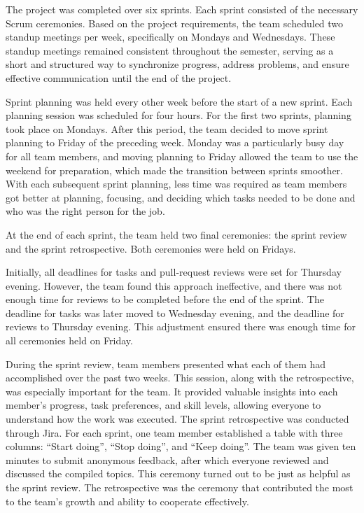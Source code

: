 \medskip

\hspace*{1cm}The project was completed over six sprints. Each sprint consisted of the necessary Scrum ceremonies. Based on the project requirements, the team scheduled two standup meetings per week, specifically on Mondays and Wednesdays. These standup meetings remained consistent throughout the semester, serving as a short and structured way to synchronize progress, address problems, and ensure effective communication until the end of the project.

\medskip
\medskip

\hspace*{1cm}Sprint planning was held every other week before the start of a new sprint. Each planning session was scheduled for four hours. For the first two sprints, planning took place on Mondays. After this period, the team decided to move sprint planning to Friday of the preceding week. Monday was a particularly busy day for all team members, and moving planning to Friday allowed the team to use the weekend for preparation, which made the transition between sprints smoother. With each subsequent sprint planning, less time was required as team members got better at planning, focusing, and deciding which tasks needed to be done and who was the right person for the job.

\medskip

\hspace*{1cm}At the end of each sprint, the team held two final ceremonies: the sprint review and the sprint retrospective. Both ceremonies were held on Fridays.

\hspace*{1cm}Initially, all deadlines for tasks and pull-request reviews were set for Thursday evening. However, the team found this approach ineffective, and there was not enough time for reviews to be completed before the end of the sprint. The deadline for tasks was later moved to Wednesday evening, and the deadline for reviews to Thursday evening. This adjustment ensured there was enough time for all ceremonies held on Friday.

\hspace*{1cm}During the sprint review, team members presented what each of them had accomplished over the past two weeks. This session, along with the retrospective, was especially important for the team. It provided valuable insights into each member's progress, task preferences, and skill levels, allowing everyone to understand how the work was executed. The sprint retrospective was conducted through Jira. For each sprint, one team member established a table with three columns: “Start doing”, “Stop doing”, and “Keep doing”. The team was given ten minutes to submit anonymous feedback, after which everyone reviewed and discussed the compiled topics. This ceremony turned out to be just as helpful as the sprint review. The retrospective was the ceremony that contributed the most to the team's growth and ability to cooperate effectively.

